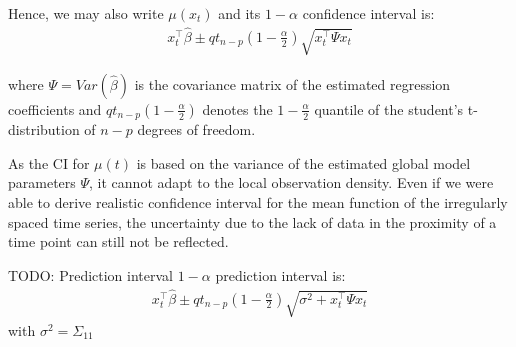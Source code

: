 Hence, we may also write $\mu(x_t)$ and its $1-\alpha$ confidence interval is:
\begin{gather*}
    x_{t}^{\top} \hat{\beta} \pm qt_{n-p}(1-\frac{\alpha}{2})  \sqrt{x_t^{\top} \Psi x_t}
\end{gather*}

where $\Psi = Var(\hat{\beta})$ is the covariance matrix of the estimated regression coefficients
and $qt_{n-p}(1-\frac{\alpha}{2})$ denotes the $1-\frac{\alpha}{2}$ quantile of the student's t-distribution of
$n-p$ degrees of freedom.

As the CI for $\mu(t)$ is based on the variance of the estimated global model parameters $\Psi$,
it cannot adapt to the local observation density.
Even if we were able to derive realistic confidence interval for the mean function of the irregularly spaced
time series, the uncertainty due to the lack of data in the proximity of a time point can still not be reflected.




TODO: Prediction interval
$1-\alpha$ prediction interval is:
\begin{gather*}
    x_{t}^{\top} \hat{\beta} \pm qt_{n-p}(1-\frac{\alpha}{2})  \sqrt{\sigma^2 + x_t^{\top} \Psi x_t}
\end{gather*}
with $\sigma^2 = \Sigma_{11}$





